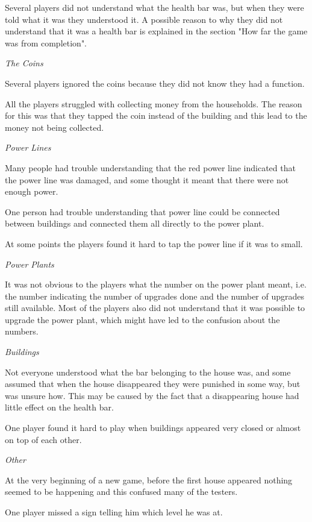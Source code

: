 			Several players did not understand what the health bar was, but when they were told what it was they understood it. A possible reason to why they did not understand that it was a health bar is explained in the section "How far the game was from completion".

		\textit{The Coins}

			Several players ignored the coins because they did not know they had a function.

			All the players struggled with collecting money from the households. The reason for this was that they tapped the coin instead of the building and this lead to the money not being collected.

		\textit{Power Lines}

			Many people had trouble understanding that the red power line indicated that the power line was damaged, and some thought it meant that there were not enough power.

			One person had trouble understanding that power line could be connected between buildings and connected them all directly to the power plant.

			At some points the players found it hard to tap the power line if it was to small.

		\textit{Power Plants}

			It was not obvious to the players what the number on the power plant meant, i.e. the number indicating the number of upgrades done and the number of upgrades still available. Most of the players also did not understand that it was possible to upgrade the power plant, which might have led to the confusion about the numbers.

		\textit{Buildings}

			Not everyone understood what the bar belonging to the house was, and some assumed that when the house disappeared they were punished in some way, but was unsure how. This may be caused by the fact that a disappearing house had little effect on the health bar.

			One player found it hard to play when buildings appeared very closed or almost on top of each other.

		\textit{Other}

			At the very beginning of a new game, before the first house appeared nothing seemed 
			to be happening and this confused many of the testers.

			One player missed a sign telling him which level he was at.

